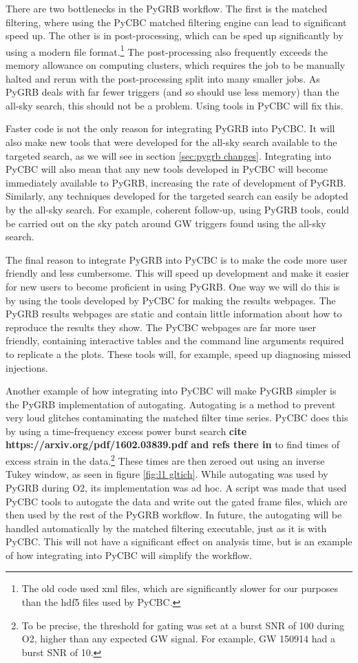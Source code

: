 \documentclass[11pt]{cuthesis}
\begin{document}
There are two bottlenecks in the PyGRB workflow. The first is the matched filtering, where using the PyCBC matched filtering engine can lead to significant speed up. The other is in post-processing, which can be sped up significantly by using a modern file format.\footnote{The old code used xml files, which are significantly slower for our purposes than the hdf5 files used by PyCBC.} The post-processing also frequently exceeds the memory allowance on computing clusters, which requires the job to be manually halted and rerun with the post-processing split into many smaller jobs. As PyGRB deals with far fewer triggers (and so should use less memory) than the all-sky search, this should not be a problem. Using tools in PyCBC will fix this. 

Faster code is not the only reason for integrating PyGRB into PyCBC. It will also make new tools that were developed for the all-sky search available to the targeted search, as we will see in section \ref{sec:pygrb changes}.  Integrating into PyCBC will also mean that any new tools developed in PyCBC will become immediately available to PyGRB, increasing the rate of development of PyGRB. Similarly, any techniques developed for the targeted search can easily be adopted by the all-sky search. For example, coherent follow-up, using PyGRB tools, could be carried out on the sky patch around GW triggers found using the all-sky search.

The final reason to integrate PyGRB into PyCBC is to make the code more user friendly and less cumbersome. This will speed up development and make it easier for new users to become proficient in using PyGRB. One way we will do this is by using the tools developed by PyCBC for making the results webpages. The PyGRB results webpages are static and contain little information about how to reproduce the results they show. The PyCBC webpages are far more user friendly, containing interactive tables and the command line arguments required to replicate a the plots. These tools will, for example, speed up diagnosing missed injections. 

Another example of how integrating into PyCBC will make PyGRB simpler is the PyGRB implementation of autogating. Autogating is a method to prevent very loud glitches contaminating the matched filter time series. PyCBC does this by using a time-frequency excess power burst search \textbf{cite https://arxiv.org/pdf/1602.03839.pdf and refs there in } to find times of excess strain in the data.\footnote{To be precise, the threshold for gating was set at a burst SNR of 100 during O2, higher than any expected GW signal. For example, GW 150914 had a burst SNR of 10.} These times are then zeroed out using an inverse Tukey window, as seen in figure \ref{fig:l1 gltich}.  While autogating was used by PyGRB during O2, its implementation was ad hoc. A script was made that used PyCBC tools to autogate the data and write out the gated frame files, which are then used by the rest of the PyGRB workflow. In future, the autogating will be handled automatically by the matched filtering executable, just as it is with PyCBC. This will not have a significant effect on analysis time, but is an example of how integrating into PyCBC will simplify the workflow.
\end{document}
